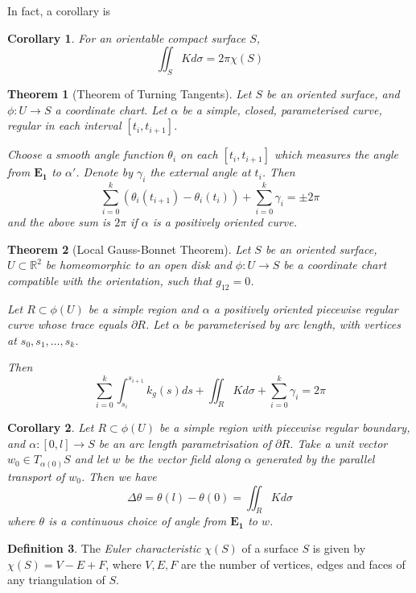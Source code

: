 \documentclass[10pt, oneside, reqno]{amsart}
\newcommand{\R}{\mathbb{R}}
\theoremstyle{plain}%
\newtheorem{thm}{Theorem}[section]
\newtheorem*{cor}{Corollary}
\theoremstyle{definition}
\newtheorem{defn}[thm]{Definition}
\theoremstyle{remark}
\begin{document}
In fact, a corollary is

\begin{cor}
	For an orientable compact surface $S$, \[ \iint_S K d \sigma = 2 \pi \chi(S) \]
\end{cor}

\begin{thm}[Theorem of Turning Tangents]
	Let $S$ be an oriented surface, and $\phi : U \rightarrow S$ a coordinate chart.  Let $\alpha$ be a simple, closed, parameterised curve, regular in each interval $[ t_i, t_{i+1}]$. 
	
	Choose a smooth angle function $\theta_i$ on each $[t_i, t_{i+1}]$ which measures the angle from $\mathbf{E_1}$ to $\alpha'$.  Denote by $\gamma_i$ the external angle at $t_i$.  Then \[
		\sum_{i=0}^k (\theta_i(t_{i+1})- \theta_i(t_i)) + \sum_{i = 0}^k \gamma_i = \pm 2 \pi
	\]
	and the above sum is $2 \pi$ if $\alpha $ is a positively oriented curve.
\end{thm}

\begin{thm}[Local Gauss-Bonnet Theorem]
	Let $S$ be an oriented surface, $U \subset \R^2$ be homeomorphic to an open disk and $\phi: U \rightarrow S$ be a coordinate chart compatible with the orientation, such that $g_{12} = 0$.
	
	Let $R \subset \phi(U)$ be a simple region and $\alpha$ a positively oriented piecewise regular curve whose trace equals $\partial R$. Let $\alpha$ be parameterised by arc length, with vertices at $s_0, s_1, \dots, s_k$.
	
	Then \[
		\sum_{i=0}^k \int_{s_i}^{s_{i+1}} k_g(s) ds + \iint_R K d \sigma + \sum_{i = 0}^k \gamma_i = 2 \pi
	\]
\end{thm}

\begin{cor}
	Let $R \subset \phi(U)$ be a simple region with piecewise regular boundary, and $\alpha: [0,l] \rightarrow S$ be an arc length parametrisation of $\partial R$.   
	Take a unit vector $w_0 \in T_{\alpha(0)}S$ and let $w$ be the vector field along $\alpha$ generated by the parallel transport of $w_0$.  Then we have 
	\[ \Delta \theta = \theta(l) - \theta(0) = \iint_R K d \sigma \]
	where $\theta$ is a continuous choice of angle from $\mathbf{E_1}$ to $w$.
\end{cor}


\begin{defn}
	The \emph{Euler characteristic} $ \chi(S)$ of a surface $S$ is given by $\chi(S) = V - E + F$, where $V,E,F$ are the number of vertices, edges and faces of any triangulation of $S$.
\end{defn}
\end{document}
